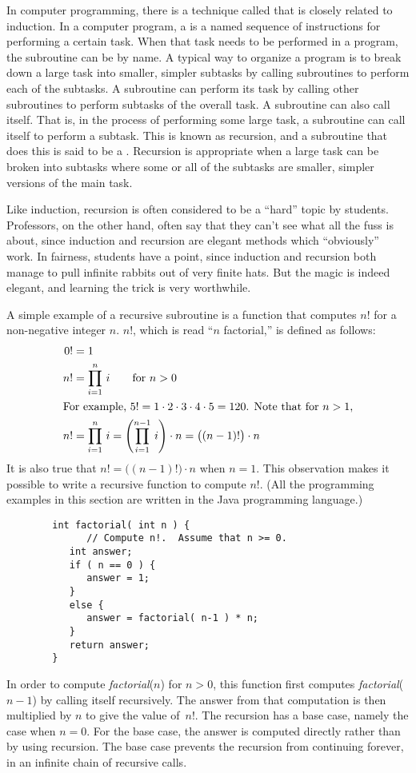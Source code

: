 In computer programming, there is a technique called 
that is closely related to induction.  In a computer program, a
 is a named sequence of instructions for performing
a certain task.  When that task needs to be performed in a program,
the subroutine can be  by name.
A typical way to organize a program is to break down a large task
into smaller, simpler subtasks by calling subroutines to perform
each of the subtasks.  A subroutine can perform its task by
calling other subroutines to perform subtasks of the overall task.
A subroutine can also call itself.  That is, in the process of
performing some large task, a subroutine can call itself to perform
a subtask.  This is known as recursion, and a subroutine that does
this is said to be a .  Recursion is
appropriate when a large task can be broken into subtasks where
some or all of the subtasks are smaller, simpler versions of the
main task.

Like induction, recursion is often considered to be a ``hard''
topic by students.  Professors, on the other hand, often say
that they can't see what all the fuss is about, since induction
and recursion are elegant methods which ``obviously'' work.
In fairness, students have a point, since induction and recursion
both manage to pull infinite rabbits out of very finite hats.
But the magic is indeed elegant, and learning the trick is
very worthwhile.

\medbreak

A simple example of a recursive subroutine is a function that
computes $n!$ for a non-negative integer $n$.  $n!$, which is read ``$n$ factorial,''
is defined as follows:
\begin{align*}
0! &= 1\\
n! &= \prod_{i=1}^n\,i\text{\qquad for $n>0$}\\
\intertext{For example, $5!=1\cdot2\cdot3\cdot4\cdot5=120$.  Note that for $n>1$,}
n! &= \prod_{i=1}^n\,i = \left(\prod_{i=1}^{n-1}\,i\right)\cdot n = \big((n-1)!\big)\cdot n
\end{align*}
It is also true that $n!=\big((n-1)!\big)\cdot n$ when $n=1$.  This observation
makes it possible to write a recursive function to compute $n!$.
(All the programming examples in this section are written in the Java
programming language.)
\begin{verbatim}
        int factorial( int n ) {
              // Compute n!.  Assume that n >= 0.
           int answer;
           if ( n == 0 ) {
              answer = 1;
           }
           else {
              answer = factorial( n-1 ) * n;
           } 
           return answer;
        }
\end{verbatim}
In order to compute \textit{factorial}($n$) for $n>0$, this function
first computes \textit{factorial}($n-1$) by calling itself recursively.
The answer from that computation is then multiplied by $n$ to give the
value of~$n!$.  The recursion has a base case, namely the case when
$n=0$.  For the base case, the answer is computed directly rather
than by using recursion.  The base case prevents the recursion from
continuing forever, in an infinite chain of recursive calls.

